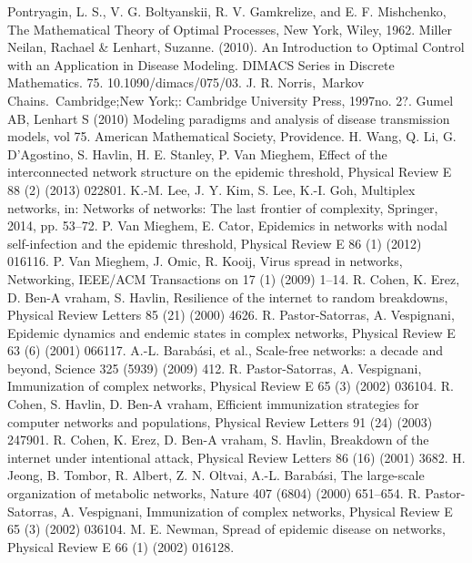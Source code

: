 \documentclass[UTF8]{ctexart}
\begin{document}
\begin{thebibliography}{99}
	Pontryagin, L. S., V. G. Boltyanskii, R. V. Gamkrelize, and E. F. Mishchenko, The Mathematical\label{1}
	Theory of Optimal Processes, New York, Wiley, 1962.
	Miller Neilan, Rachael \& Lenhart, Suzanne. (2010). An Introduction to Optimal Control with an Application in Disease Modeling. DIMACS Series in Discrete Mathematics. 75. 10.1090/dimacs/075/03. 
	J. R. Norris, Markov Chains. Cambridge;New York;: Cambridge University Press, 1997no. 2?.
	Gumel AB, Lenhart S (2010) Modeling paradigms and analysis of disease transmission models, vol 75. American Mathematical Society, Providence.
	H. Wang, Q. Li, G. D’Agostino, S. Havlin, H. E. Stanley, P. Van Mieghem, Effect of the interconnected network structure
	on the epidemic threshold, Physical Review E 88 (2) (2013) 022801.
	K.-M. Lee, J. Y. Kim, S. Lee, K.-I. Goh, Multiplex networks, in: Networks of networks: The last frontier of complexity,
	Springer, 2014, pp. 53–72.
	P. Van Mieghem, E. Cator, Epidemics in networks with nodal self-infection and the epidemic threshold, Physical Review
	E 86 (1) (2012) 016116.
	P. Van Mieghem, J. Omic, R. Kooij, Virus spread in networks, Networking, IEEE/ACM Transactions on 17 (1) (2009)
	1–14.
	R. Cohen, K. Erez, D. Ben-A vraham, S. Havlin, Resilience of the internet to random breakdowns, Physical Review Letters
	85 (21) (2000) 4626.
	R. Pastor-Satorras, A. Vespignani, Epidemic dynamics and endemic states in complex networks, Physical Review E 63 (6) (2001) 066117.
	 A.-L. Barabási, et al., Scale-free networks: a decade and beyond, Science 325 (5939) (2009) 412.
	R. Pastor-Satorras, A. Vespignani, Immunization of complex networks, Physical Review E 65 (3) (2002) 036104.
	R. Cohen, S. Havlin, D. Ben-A vraham, Efficient immunization strategies for computer networks and populations, Physical
	Review Letters 91 (24) (2003) 247901.
	R. Cohen, K. Erez, D. Ben-A vraham, S. Havlin, Breakdown of the internet under intentional attack, Physical Review
	Letters 86 (16) (2001) 3682.
	 H. Jeong, B. Tombor, R. Albert, Z. N. Oltvai, A.-L. Barabási, The large-scale organization of metabolic networks, Nature
	407 (6804) (2000) 651–654.
	 R. Pastor-Satorras, A. Vespignani, Immunization of complex networks, Physical Review E 65 (3) (2002) 036104.
	M. E. Newman, Spread of epidemic disease on networks, Physical Review E 66 (1) (2002) 016128.

\end{thebibliography}
\end{document}

